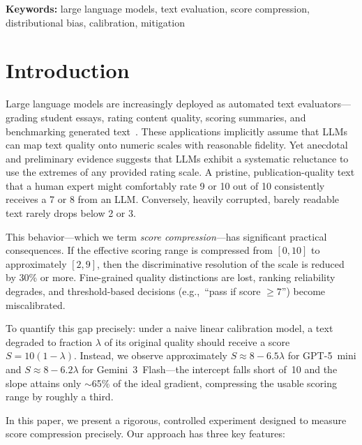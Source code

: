 \documentclass[11pt]{article}
\newcommand{\eg}{e.g.,\ }
\begin{document}
\textbf{Keywords:} large language models, text evaluation, score compression, distributional bias, calibration, mitigation

\section{Introduction}
\label{sec:intro}

Large language models are increasingly deployed as automated text evaluators---grading student essays, rating content quality, scoring summaries, and benchmarking generated text~\citep{zheng2023judging}. These applications implicitly assume that LLMs can map text quality onto numeric scales with reasonable fidelity. Yet anecdotal and preliminary evidence suggests that LLMs exhibit a systematic reluctance to use the extremes of any provided rating scale. A pristine, publication-quality text that a human expert might comfortably rate 9 or 10 out of 10 consistently receives a 7 or 8 from an LLM. Conversely, heavily corrupted, barely readable text rarely drops below 2 or 3.

This behavior---which we term \emph{score compression}---has significant practical consequences. If the effective scoring range is compressed from $[0, 10]$ to approximately $[2, 9]$, then the discriminative resolution of the scale is reduced by 30\% or more. Fine-grained quality distinctions are lost, ranking reliability degrades, and threshold-based decisions (\eg ``pass if score $\geq 7$'') become miscalibrated.

To quantify this gap precisely: under a naive linear calibration model, a text degraded to fraction $\lambda$ of its original quality should receive a score $S = 10(1 - \lambda)$. Instead, we observe approximately $S \approx 8 - 6.5\lambda$ for GPT-5~mini and $S \approx 8 - 6.2\lambda$ for Gemini~3~Flash---the intercept falls short of~10 and the slope attains only $\sim$65\% of the ideal gradient, compressing the usable scoring range by roughly a third.

In this paper, we present a rigorous, controlled experiment designed to measure score compression precisely. Our approach has three key features:
\end{document}
